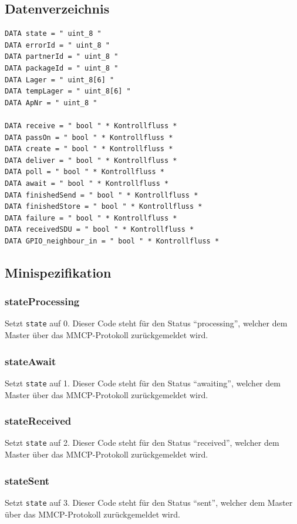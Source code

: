 \subsection{Datenverzeichnis}
\begin{lstlisting}[style=CBlank]
DATA state = " uint_8 "
DATA errorId = " uint_8 "
DATA partnerId = " uint_8 "
DATA packageId = " uint_8 "
DATA Lager = " uint_8[6] "
DATA tempLager = " uint_8[6] "
DATA ApNr = " uint_8 "

DATA receive = " bool " * Kontrollfluss *
DATA passOn = " bool " * Kontrollfluss *
DATA create = " bool " * Kontrollfluss *
DATA deliver = " bool " * Kontrollfluss *
DATA poll = " bool " * Kontrollfluss *
DATA await = " bool " * Kontrollfluss *
DATA finishedSend = " bool " * Kontrollfluss *
DATA finishedStore = " bool " * Kontrollfluss *
DATA failure = " bool " * Kontrollfluss *
DATA receivedSDU = " bool " * Kontrollfluss *
DATA GPIO_neighbour_in = " bool " * Kontrollfluss *
\end{lstlisting}

\subsection{Minispezifikation}

\subsubsection*{stateProcessing}
Setzt \texttt{state} auf 0. Dieser Code steht für den Status \enquote{processing}, welcher dem Master über das MMCP-Protokoll zurückgemeldet wird.

\subsubsection*{stateAwait}
Setzt \texttt{state} auf 1. Dieser Code steht für den Status \enquote{awaiting}, welcher dem Master über das MMCP-Protokoll zurückgemeldet wird.

\subsubsection*{stateReceived}
Setzt \texttt{state} auf 2. Dieser Code steht für den Status \enquote{received}, welcher dem Master über das MMCP-Protokoll zurückgemeldet wird.

\subsubsection*{stateSent}
Setzt \texttt{state} auf 3. Dieser Code steht für den Status \enquote{sent}, welcher dem Master über das MMCP-Protokoll zurückgemeldet wird.

